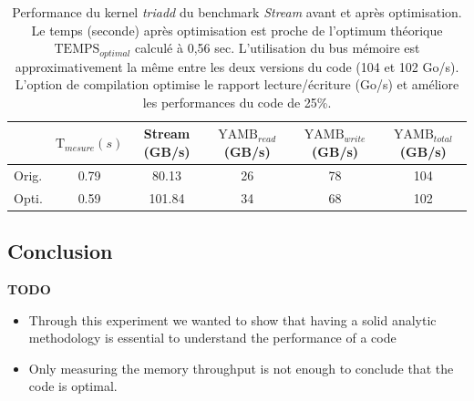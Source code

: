     \begin{table}[htbp]
        \centering

        \caption{Performance du kernel \textit{triadd} du benchmark \textit{Stream} avant et après optimisation. Le temps (seconde) après optimisation est proche de l'optimum théorique $\text{TEMPS}_{optimal}$  calculé à 0,56 sec. L'utilisation du bus mémoire est approximativement la même entre les deux versions du code (104 et 102 Go/s). L'option de compilation optimise le rapport lecture/écriture (Go/s) et améliore les performances du code de 25\%.}

            \begin{tabular}{l|c|c|c|c|c|}
            \cline{2-6}
                                            & $\text{T}_{mesure} (s)$ & Stream  (GB/s) & $\text{YAMB}_{read}$ (GB/s) & $\text{YAMB}_{write}$ (GB/s) & $\text{YAMB}_{total}$ (GB/s) \\ \hline
            \multicolumn{1}{|l|}{Orig.}  & 0.79   & 80.13  & 26        & 78         & 104        \\ \hline
            \multicolumn{1}{|l|}{Opti.} & 0.59   & 101.84 & 34        & 68         & 102        \\ \hline
            \end{tabular}
            \label{table:stream_res}
        \end{table}
    
    
    

\subsection{Conclusion}

\textbf{TODO}
\begin{itemize}
    \item Through this experiment we wanted to show that having a solid analytic methodology is essential to understand the performance of a code
    \item Only measuring the memory throughput is not enough to conclude that the code is optimal. 
\end{itemize}


\printbibliography[heading=references,segment=\therefsegment]
